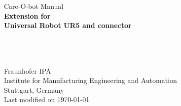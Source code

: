 \documentclass[12pt,twoside]{report}
\begin{document}
\begin{titlepage}
\vspace*{13mm}
\begin{center}
  \vspace{10mm} 
         {\large \hspace{20mm} Care-O-bot Manual\\}
  \vspace{10mm}
       {\Large
          \bf
          \hspace{20mm} Extension for\\} 
  \vspace{5mm}
       {\Large
          \bf
          \hspace{20mm} Universal Robot UR5 and connector\\}

  \vspace{80mm}
  \makebox[40mm]{}\\
  \makebox[40mm]{}\\
    \makebox[40mm]{}\\
  \vspace{10mm}
         {\large \hspace{20mm} Fraunhofer IPA} \\
  \vspace{5mm}
         {\large \hspace{20mm} Institute for Manufacturing Engineering and Automation} \\
         {\large \hspace{20mm} Stuttgart, Germany} \\
  \vfill
         {\large \hspace{20mm} Last modified on \today}
\end{center}
\end{titlepage}

\clearpage
\thispagestyle{empty}
\cleardoublepage
\thispagestyle{empty}\cleardoublepage %
\evensidemargin=2pt
\oddsidemargin=40pt
\renewcommand{\baselinestretch}{1.15}\normalsize
{}
\end{document}
